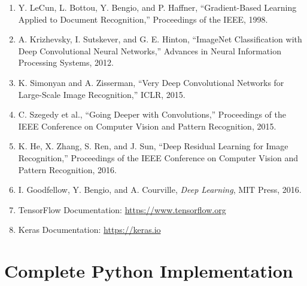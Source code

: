 \documentclass[12pt,a4paper]{article}
\begin{document}
\begin{enumerate}
    \item Y. LeCun, L. Bottou, Y. Bengio, and P. Haffner,
    ``Gradient-Based Learning Applied to Document Recognition,''
    Proceedings of the IEEE, 1998.

    \item A. Krizhevsky, I. Sutskever, and G. E. Hinton,
    ``ImageNet Classification with Deep Convolutional Neural Networks,''
    Advances in Neural Information Processing Systems, 2012.

    \item K. Simonyan and A. Zisserman,
    ``Very Deep Convolutional Networks for Large-Scale Image Recognition,''
    ICLR, 2015.

    \item C. Szegedy et al.,
    ``Going Deeper with Convolutions,''
    Proceedings of the IEEE Conference on Computer Vision and Pattern Recognition, 2015.

    \item K. He, X. Zhang, S. Ren, and J. Sun,
    ``Deep Residual Learning for Image Recognition,''
    Proceedings of the IEEE Conference on Computer Vision and Pattern Recognition, 2016.

    \item I. Goodfellow, Y. Bengio, and A. Courville,
    \textit{Deep Learning},
    MIT Press, 2016.

    \item TensorFlow Documentation:
    \url{https://www.tensorflow.org}

    \item Keras Documentation:
    \url{https://keras.io}

\end{enumerate}


\appendix

\section{Complete Python Implementation}
\end{document}
